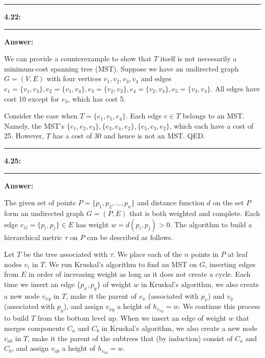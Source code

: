 \documentclass[11pt]{article}
\newcommand\question[2]{\vspace{.25in}\hrule\textbf{#1: #2}\vspace{.5em}\hrule\vspace{.10in}}
\newcommand\answer{\vspace{.10in}\textbf{Answer: }}
\begin{document}
\raggedright
\newcommand\NAME{Stewart Dulaney}  %
\newcommand\SID{904-064-791}     %
\newcommand\HWNUM{4}              %

\question{4.22}{}

\answer

We can provide a counterexample to show that $T$ itself is not necessarily a minimum-cost spanning tree (MST). Suppose we have an undirected graph $G = (V, E)$ with four vertices $v_1, v_2, v_3, v_4$ and edges $e_1 = \{v_1, v_3\}, e_2 = \{v_1, v_4\}, e_3 = \{v_2, v_3\}, e_4 = \{v_2, v_4\}, e_5 = \{v_3, v_4\}$. All edges have cost 10 except for $e_3$, which has cost 5.\newline

Consider the case when $T = \{e_1, e_5, e_4\}$. Each edge $e \in T$ belongs to an MST. Namely, the MST's $\{e_1, e_2, e_3\}, \{e_3, e_4, e_2\}, \{e_5, e_3, e_2\}$, which each have a cost of 25. However, $T$ has a cost of 30 and hence is not an MST. QED.

\clearpage

\question{4.25}{}

\answer

The given set of points $P = \{p_1, p_2, ..., p_n\}$ and distance function $d$ on the set $P$ form an undirected graph $G = (P, E)$ that is both weighted and complete. Each edge $e_{ij} = \{p_i, p_j\} \in E$ has weight $w = d(p_i, p_j) > 0$. The algorithm to build a hierarchical metric $\tau$ on $P$ can be described as follows.\newline

Let $T$ be the tree associated with $\tau$. We place each of the $n$ points in $P$ at leaf nodes $v_i$ in $T$. We run Kruskal's algorithm to find an MST on $G$, inserting edges from $E$ in order of increasing weight as long as it does not create a cycle. Each time we insert an edge $\{p_x, p_y\}$ of weight $w$ in Kruskal's algorithm, we also create a new node $v_{xy}$ in $T$, make it the parent of $v_x$ (associated with $p_x$) and $v_y$ (associated with $p_y$), and assign $v_{xy}$ a height of $h_{v_{xy}} = w$. We continue this process to build $T$ from the bottom level up. When we insert an edge of weight $w$ that merges components $C_a$ and $C_b$ in Kruskal's algorithm, we also create a new node $v_{ab}$ in $T$, make it the parent of the subtrees that (by induction) consist of $C_a$ and $C_b$, and assign $v_{ab}$ a height of $h_{v_{ab}} = w$.\newline
\end{document}
